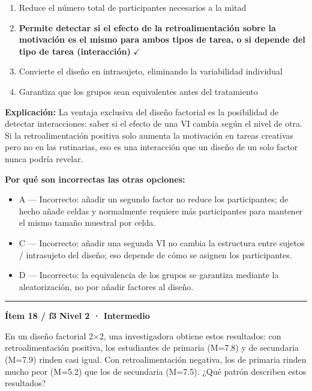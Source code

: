 \documentclass[12pt,a4paper]{article}
\begin{document}
\begin{enumerate}
  \item[A.] Reduce el número total de participantes necesarios a la mitad
  \item[\textbf{\color{verde}B.}] \textbf{\color{verde} Permite detectar si el efecto de la retroalimentación sobre la motivación es el mismo para ambos tipos de tarea, o si depende del tipo de tarea (interacción)} \hfill $\checkmark$
  \item[C.] Convierte el diseño en intrasujeto, eliminando la variabilidad individual
  \item[D.] Garantiza que los grupos sean equivalentes antes del tratamiento
\end{enumerate}

\noindent\textbf{\color{azul}Explicación:} La ventaja exclusiva del diseño factorial es la posibilidad de detectar interacciones: saber si el efecto de una VI cambia según el nivel de otra. Si la retroalimentación positiva solo aumenta la motivación en tareas creativas pero no en las rutinarias, eso es una interacción que un diseño de un solo factor nunca podría revelar.

\noindent\textbf{\color{gris}Por qué son incorrectas las otras opciones:}
\begin{itemize}
  \item {\small A — Incorrecto: añadir un segundo factor no reduce los participantes; de hecho añade celdas y normalmente requiere más participantes para mantener el mismo tamaño muestral por celda.}
  \item {\small C — Incorrecto: añadir una segunda VI no cambia la estructura entre sujetos / intrasujeto del diseño; eso depende de cómo se asignen los participantes.}
  \item {\small D — Incorrecto: la equivalencia de los grupos se garantiza mediante la aleatorización, no por añadir factores al diseño.}
\end{itemize}
\vspace{8pt}\hrule\vspace{10pt}

\begin{mdframed}[backgroundcolor=fondogris,linecolor=ambar,linewidth=1pt,innerleftmargin=10pt,innerrightmargin=10pt,innertopmargin=7pt,innerbottommargin=7pt]
\textbf{Ítem 18 / f3} \hfill {\small\bfseries\color{ambar} Nivel 2 · Intermedio}
\end{mdframed}

En un diseño factorial 2×2, una investigadora obtiene estos resultados: con retroalimentación positiva, los estudiantes de primaria (M=7.8) y de secundaria (M=7.9) rinden casi igual. Con retroalimentación negativa, los de primaria rinden mucho peor (M=5.2) que los de secundaria (M=7.5). ¿Qué patrón describen estos resultados?
\end{document}
